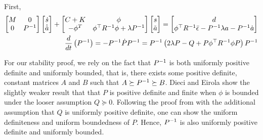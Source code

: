 First,  \begin{align}
    \begin{bmatrix}
        M & 0 \\
        0 & P^{-1} %
    \end{bmatrix}
    \begin{bmatrix}
        \dot{\BB s} \\ \dot {\tilde{\BB a}}
    \end{bmatrix} 
    + 
    \begin{bmatrix}
        C + K & \phi \\
        -\phi^T & \phi^\top R\inv \phi + \lambda P \inv \\ %
    \end{bmatrix}
    \begin{bmatrix}
        \BB s \\ \tilde{\BB a}
    \end{bmatrix} 
    =
    \begin{bmatrix}
        \BB d \\
        \phi^\top R\inv \bar{\epsilon} - P\inv \lambda \BB a - P\inv \dot{\BB a}
    \end{bmatrix}
    \label{eq:stacked-dynamics}
    \\
    \frac{d}{dt}\left(P\inv\right) = - P\inv \dot P P\inv = P\inv \left(2 \lambda P - Q + P \phi ^\top R^{-1} \phi P\right) P\inv
    \label{eq:Pinv-dynamics}
\end{align}


For our stability proof, we rely on the fact that $P^{-1}$ is both uniformly positive definite and uniformly bounded, that is, there exists some positive definite, constant matrices $A$ and $B$ such that $A \succeq P^{-1} \succeq B$.
Dieci and Eirola \cite{dieci_positive_1994} show the slightly weaker result that that $P$ is positive definite and finite when $\phi$ is bounded under the looser assumption $Q\succeq0$. Following the proof from \cite{dieci_positive_1994} with the additional assumption that $Q$ is uniformly positive definite, one can show the uniform definiteness and uniform boundedness of $P$. Hence, $P^{-1}$ is also uniformly positive definite and uniformly bounded.

